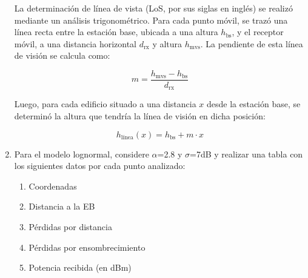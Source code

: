 \begin{enumerate}
La determinación de línea de vista (LoS, por sus siglas en inglés) se realizó mediante un análisis trigonométrico. Para cada punto móvil, se trazó una línea recta entre la estación base, ubicada a una altura $h_{\text{bs}}$, y el receptor móvil, a una distancia horizontal $d_{\text{rx}}$ y altura $h_{\text{mvs}}$. La pendiente de esta línea de visión se calcula como:

\[
m = \frac{h_{\text{mvs}} - h_{\text{bs}}}{d_{\text{rx}}}
\]

Luego, para cada edificio situado a una distancia $x$ desde la estación base, se determinó la altura que tendría la línea de visión en dicha posición:

\[
h_{\text{línea}}(x) = h_{\text{bs}} + m \cdot x
\]

    \item Para el modelo lognormal, considere $\alpha$=2.8 y $\sigma$=7dB y realizar una tabla con los siguientes datos por cada punto analizado:
          \begin{enumerate}
              \item Coordenadas
              \item Distancia a la EB
              \item Pérdidas por distancia
              \item Pérdidas por ensombrecimiento
              \item Potencia recibida (en dBm)
          \end{enumerate}
          \begin{table}[H]
\centering
\caption{Resultados del Modelo Lognormal ($\alpha=2.8$, $\sigma=7$ dB)}
\label{tab:lognormal_results}
\end{table}
\end{enumerate}
